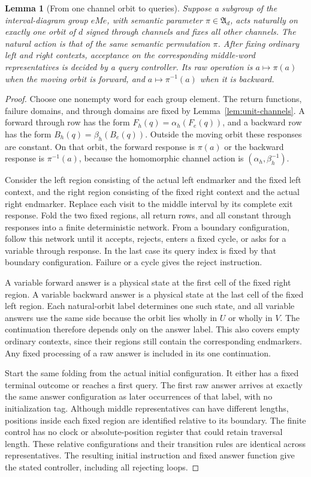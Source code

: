 \documentclass[11pt,a4paper]{article}
\newtheorem{lemma}[theorem]{Lemma}
\theoremstyle{definition}
\theoremstyle{remark}
\newcommand{\Alt}{\mathfrak A}
\begin{document}
\begin{lemma}[From one channel orbit to queries]\label{lem:query-interface}
Suppose a subgroup of the interval-diagram group $eMe$, with semantic
parameter $\pi\in\Alt_d$, acts naturally on exactly one orbit of
$d$ signed through channels and fixes all other channels. The natural
action is that of the same semantic permutation $\pi$. After fixing
ordinary left and right contexts, acceptance on the corresponding
middle-word representatives is decided by a query controller. Its raw
operation is $a\mapsto\pi(a)$ when the moving orbit is forward, and
$a\mapsto\pi^{-1}(a)$ when it is backward.
\end{lemma}
\begin{proof}
Choose one nonempty word for each group element. The return functions,
failure domains, and through domains are fixed by
Lemma~\ref{lem:unit-channels}. A forward through row has the form
$F_h(q)=\alpha_h(F_e(q))$, and a backward row has the form
$B_h(q)=\beta_h(B_e(q))$. Outside the moving orbit these responses
are constant. On that orbit, the forward response is $\pi(a)$ or
the backward response is $\pi^{-1}(a)$, because the homomorphic
channel action is $(\alpha_h,\beta_h^{-1})$.

Consider the left region consisting of the actual left endmarker and
the fixed left context, and the right region consisting of the fixed
right context and the actual right endmarker. Replace each visit to
the middle interval by its complete exit response. Fold the two fixed
regions, all return rows, and all constant through responses into a
finite deterministic network. From a boundary configuration, follow
this network until it accepts, rejects, enters a fixed cycle, or asks
for a variable through response. In the last case its query index is
fixed by that boundary configuration. Failure or a cycle gives the
reject instruction.

A variable forward answer is a physical state at the first cell of
the fixed right region. A variable backward answer is a physical
state at the last cell of the fixed left region. Each natural-orbit
label determines one such state, and all variable answers use the
same side because the orbit lies wholly in $U$ or wholly in $V$.
The continuation therefore depends only on the answer label. This
also covers empty ordinary contexts, since their regions still contain
the corresponding endmarkers. Any fixed processing of a raw answer
is included in its one continuation.

Start the same folding from the actual initial configuration. It
either has a fixed terminal outcome or reaches a first query. The
first raw answer arrives at exactly the same answer configuration as
later occurrences of that label, with no initialization tag. Although
middle representatives can have different lengths, positions inside
each fixed region are identified relative to its boundary. The finite
control has no clock or absolute-position register that could retain
traversal length. These relative configurations and their transition
rules are identical across representatives. The resulting initial
instruction and fixed answer function give the stated controller,
including all rejecting loops.
\end{proof}
\end{document}
